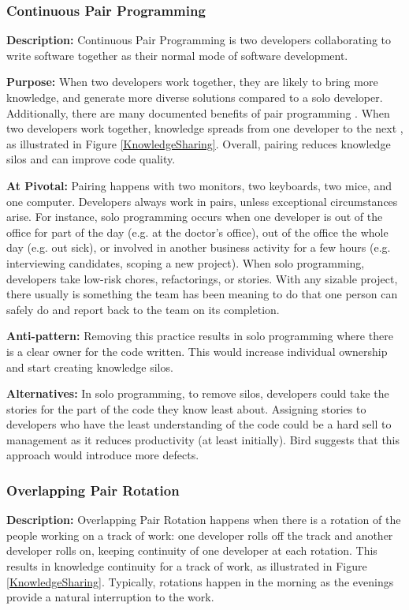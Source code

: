 \subsubsection{Continuous Pair Programming}
\textbf{Description:} Continuous Pair Programming is two developers collaborating to write software together as their normal mode of software development.

\textbf{Purpose:} When two developers work together, they are likely to bring more knowledge, and generate more diverse solutions compared to a solo developer. Additionally, there are many documented benefits of pair programming \cite {Williams2002}. When two developers work together, knowledge spreads from one developer to the next \cite{Zieris2016KnowledgeTransfer}, as illustrated in Figure \ref{KnowledgeSharing}. Overall, pairing reduces knowledge silos and can improve code quality.

\textbf{At Pivotal:} Pairing happens with two monitors, two keyboards, two mice, and one computer. Developers always work in pairs, unless exceptional circumstances arise. For instance, solo programming occurs when one developer is out of the office for part of the day (e.g. at the doctor’s office), out of the office the whole day (e.g. out sick), or involved in another business activity for a few hours (e.g. interviewing candidates, scoping a new project). When solo programming, developers take low-risk chores, refactorings, or stories. With any sizable project, there usually is something the team has been meaning to do that one person can safely do and report back to the team on its completion. 

\textbf{Anti-pattern:} Removing this practice results in solo programming where there is a clear owner for the code written. This would increase individual ownership and start creating knowledge silos. 

\textbf{Alternatives:} In solo programming, to remove silos, developers could take the stories for the part of the code they know least about. Assigning stories to developers who have the least understanding of the code could be a hard sell to management as it reduces productivity (at least initially). Bird \cite{BirdDontTouchMyCode} suggests that this approach would introduce more defects. 

\subsubsection{Overlapping Pair Rotation}
\textbf{Description:} Overlapping Pair Rotation happens when there is a rotation of the people working on a track of work: one developer rolls off the track and another developer rolls on, keeping continuity of one developer at each rotation. This results in knowledge continuity for a track of work, as illustrated in Figure \ref{KnowledgeSharing}. Typically, rotations happen in the morning as the evenings provide a natural interruption to the work. 


